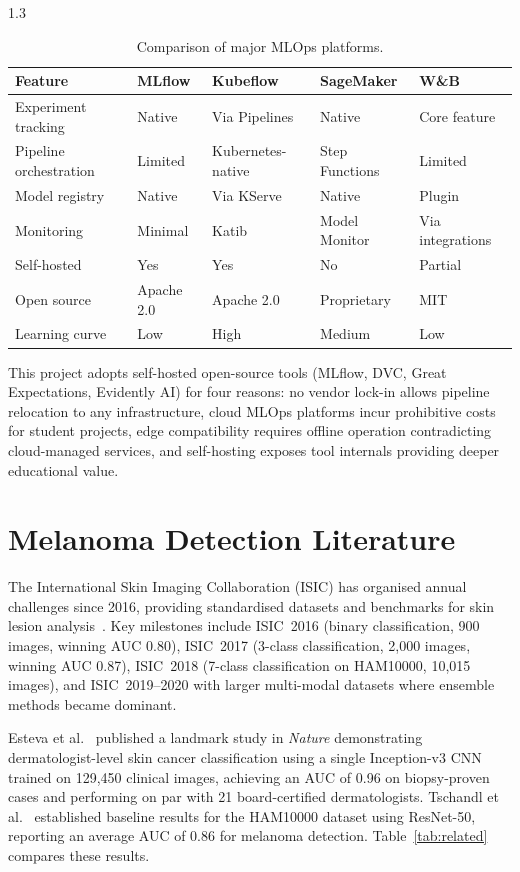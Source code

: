 \begin{spacing}{1.3}
\begin{table}[H]
\centering
\caption{Comparison of major MLOps platforms.}
\label{tab:platforms}
\begin{tabular}{lp{2.2cm}p{2.2cm}p{2.2cm}p{2.2cm}}
\toprule
\textbf{Feature} & \textbf{MLflow} & \textbf{Kubeflow} & \textbf{SageMaker} & \textbf{W\&B} \\
\midrule
Experiment tracking & Native & Via Pipelines & Native & Core feature \\
Pipeline orchestration & Limited & Kubernetes-native & Step Functions & Limited \\
Model registry & Native & Via KServe & Native & Plugin \\
Monitoring & Minimal & Katib & Model Monitor & Via integrations \\
Self-hosted & Yes & Yes & No & Partial \\
Open source & Apache 2.0 & Apache 2.0 & Proprietary & MIT \\
Learning curve & Low & High & Medium & Low \\
\bottomrule
\end{tabular}
\end{table}

This project adopts self-hosted open-source tools (MLflow, DVC, Great Expectations, Evidently AI) for four reasons: no vendor lock-in allows pipeline relocation to any infrastructure, cloud MLOps platforms incur prohibitive costs for student projects, edge compatibility requires offline operation contradicting cloud-managed services, and self-hosting exposes tool internals providing deeper educational value.

\section{Melanoma Detection Literature}

The International Skin Imaging Collaboration (ISIC) has organised annual challenges since 2016, providing standardised datasets and benchmarks for skin lesion analysis~\cite{isic_challenge}. Key milestones include ISIC~2016 (binary classification, 900 images, winning AUC 0.80), ISIC~2017 (3-class classification, 2,000 images, winning AUC 0.87), ISIC~2018 (7-class classification on HAM10000, 10,015 images), and ISIC~2019--2020 with larger multi-modal datasets where ensemble methods became dominant.

Esteva et al.~\cite{esteva2017} published a landmark study in \textit{Nature} demonstrating dermatologist-level skin cancer classification using a single Inception-v3 CNN trained on 129,450 clinical images, achieving an AUC of 0.96 on biopsy-proven cases and performing on par with 21 board-certified dermatologists. Tschandl et al.~\cite{tschandl2018} established baseline results for the HAM10000 dataset using ResNet-50, reporting an average AUC of 0.86 for melanoma detection. Table~\ref{tab:related} compares these results.


\end{spacing}
